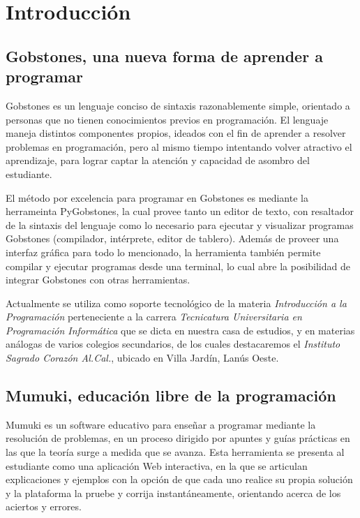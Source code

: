 \documentclass[a4paper,10pt]{article}
\begin{document}
\maketitle

\section{Introducción}

\subsection{Gobstones, una nueva forma de aprender a programar}
Gobstones es un lenguaje conciso de sintaxis razonablemente simple, orientado a personas que no tienen conocimientos previos en programación. El lenguaje maneja distintos componentes propios, ideados con el fin de aprender a resolver problemas en programación, pero al mismo tiempo intentando volver atractivo el aprendizaje, para lograr captar la atención y capacidad de asombro del estudiante.\cite{Gobstones} 

El método por excelencia para programar en Gobstones es mediante la herrameinta PyGobstones\cite{PyGobstones}, la cual provee tanto un editor de texto, con resaltador de la sintaxis del lenguaje como lo necesario para ejecutar y visualizar programas Gobstones (compilador, intérprete, editor de tablero). Además de proveer una interfaz gráfica para todo lo mencionado, la herramienta también permite compilar y ejecutar programas desde una terminal, lo cual abre la posibilidad de integrar Gobstones con otras herramientas.

Actualmente se utiliza como soporte tecnológico de la materia \textit{Introducción a la Programación} perteneciente a la carrera \textit{Tecnicatura Universitaria en Programación Informática} que se dicta en nuestra casa de estudios, y en materias análogas de varios colegios secundarios, de los cuales destacaremos el \textit{Instituto Sagrado Corazón Al.Cal.}, ubicado en Villa Jardín, Lanús Oeste.

\subsection{Mumuki, educación libre de la programación}
Mumuki es un software educativo para enseñar a programar mediante la resolución de problemas, en un proceso dirigido por apuntes y guías prácticas en las que la teoría surge a medida que se avanza. Esta herramienta se presenta al estudiante como una aplicación Web interactiva, en la que se articulan explicaciones y ejemplos con la opción de que cada uno realice su propia solución y la plataforma la pruebe y corrija instantáneamente, orientando acerca de los aciertos y errores. 
\end{document}
